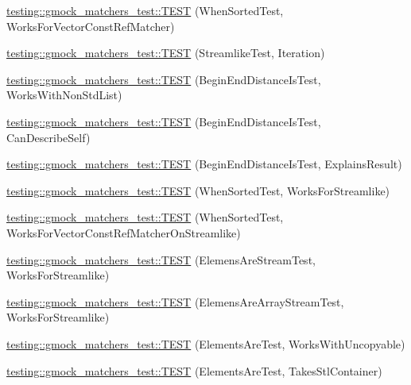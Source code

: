 \begin{DoxyCompactItemize}
\item 
\hyperlink{namespacetesting_1_1gmock__matchers__test_a0975bae51ce06a819dc1437134fd7f05}{testing\+::gmock\+\_\+matchers\+\_\+test\+::\+T\+E\+ST} (When\+Sorted\+Test, Works\+For\+Vector\+Const\+Ref\+Matcher)
\item 
\hyperlink{namespacetesting_1_1gmock__matchers__test_a5aa4eed927d4a1a8ea306d5e47dce94f}{testing\+::gmock\+\_\+matchers\+\_\+test\+::\+T\+E\+ST} (Streamlike\+Test, Iteration)
\item 
\hyperlink{namespacetesting_1_1gmock__matchers__test_add74820690e798ae8a365d08b68ddf71}{testing\+::gmock\+\_\+matchers\+\_\+test\+::\+T\+E\+ST} (Begin\+End\+Distance\+Is\+Test, Works\+With\+Non\+Std\+List)
\item 
\hyperlink{namespacetesting_1_1gmock__matchers__test_aa4ef2a94a7d75aa6116e8537deaa5f56}{testing\+::gmock\+\_\+matchers\+\_\+test\+::\+T\+E\+ST} (Begin\+End\+Distance\+Is\+Test, Can\+Describe\+Self)
\item 
\hyperlink{namespacetesting_1_1gmock__matchers__test_a89445da783c74dfa09c9c09531646f5b}{testing\+::gmock\+\_\+matchers\+\_\+test\+::\+T\+E\+ST} (Begin\+End\+Distance\+Is\+Test, Explains\+Result)
\item 
\hyperlink{namespacetesting_1_1gmock__matchers__test_a8de8e3760418cfcd33913cd30f16d117}{testing\+::gmock\+\_\+matchers\+\_\+test\+::\+T\+E\+ST} (When\+Sorted\+Test, Works\+For\+Streamlike)
\item 
\hyperlink{namespacetesting_1_1gmock__matchers__test_aa6bfe7b6cc288d93f60b9f52e095b233}{testing\+::gmock\+\_\+matchers\+\_\+test\+::\+T\+E\+ST} (When\+Sorted\+Test, Works\+For\+Vector\+Const\+Ref\+Matcher\+On\+Streamlike)
\item 
\hyperlink{namespacetesting_1_1gmock__matchers__test_adb0f512a2369d69f056e42e1cc5f3fc2}{testing\+::gmock\+\_\+matchers\+\_\+test\+::\+T\+E\+ST} (Elemens\+Are\+Stream\+Test, Works\+For\+Streamlike)
\item 
\hyperlink{namespacetesting_1_1gmock__matchers__test_a5cc317a80c3501cb7f53d07043b7270c}{testing\+::gmock\+\_\+matchers\+\_\+test\+::\+T\+E\+ST} (Elemens\+Are\+Array\+Stream\+Test, Works\+For\+Streamlike)
\item 
\hyperlink{namespacetesting_1_1gmock__matchers__test_ab403dce87c2d198a4f709d7f781d03c6}{testing\+::gmock\+\_\+matchers\+\_\+test\+::\+T\+E\+ST} (Elements\+Are\+Test, Works\+With\+Uncopyable)
\item 
\hyperlink{namespacetesting_1_1gmock__matchers__test_a290280b9e89a57833c9fc706d153b98a}{testing\+::gmock\+\_\+matchers\+\_\+test\+::\+T\+E\+ST} (Elements\+Are\+Test, Takes\+Stl\+Container)

\end{DoxyCompactItemize}

